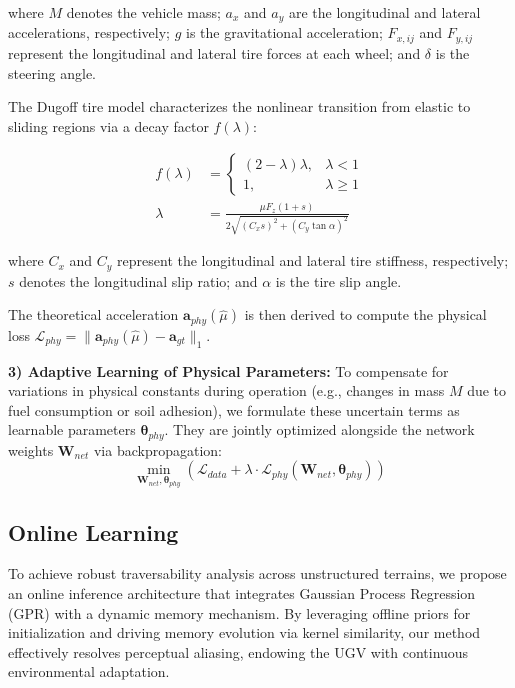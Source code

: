 \documentclass[letterpaper, 10 pt, conference]{ieeeconf}  %
\begin{document}
where $M$ denotes the vehicle mass; $a_x$ and $a_y$ are the longitudinal and lateral accelerations, respectively; $g$ is the gravitational acceleration; $F_{x,ij}$ and $F_{y,ij}$ represent the longitudinal and lateral tire forces at each wheel; and $\delta$ is the steering angle.


The Dugoff tire model characterizes the nonlinear transition from elastic to sliding regions via a decay factor $f(\lambda)$:

\begin{equation}
\label{eq:dugoff}
\begin{aligned}
f(\lambda) &= \begin{cases} (2-\lambda)\lambda, & \lambda < 1 \\ 1, & \lambda \geq 1 \end{cases} \\
\lambda &= \frac{\mu F_z (1+s)}{2 \sqrt{(C_x s)^2 + (C_y \tan \alpha)^2}}
\end{aligned}
\end{equation}

where $C_x$ and $C_y$ represent the longitudinal and lateral tire stiffness, respectively; $s$ denotes the longitudinal slip ratio; and $\alpha$ is the tire slip angle.


The theoretical acceleration $\mathbf{a}_{phy}(\hat{\mu})$ is then derived to compute the physical loss $\mathcal{L}_{phy} = \| \mathbf{a}_{phy}(\hat{\mu}) - \mathbf{a}_{gt} \|_1$.


\textbf{3) Adaptive Learning of Physical Parameters:} To compensate for variations in physical constants during operation (e.g., changes in mass $M$ due to fuel consumption or soil adhesion), we formulate these uncertain terms as learnable parameters $\boldsymbol{\theta}_{phy}$. They are jointly optimized alongside the network weights $\mathbf{W}_{net}$ via backpropagation:
\begin{equation}
\label{eq:joint_opt}
\min_{\mathbf{W}_{net}, \boldsymbol{\theta}_{phy}} \left( \mathcal{L}_{data} + \lambda \cdot \mathcal{L}_{phy}(\mathbf{W}_{net}, \boldsymbol{\theta}_{phy}) \right)
\end{equation}


\subsection{Online Learning}

To achieve robust traversability analysis across unstructured terrains, we propose an online inference architecture that integrates Gaussian Process Regression (GPR) with a dynamic memory mechanism. By leveraging offline priors for initialization and driving memory evolution via kernel similarity, our method effectively resolves perceptual aliasing, endowing the UGV with continuous environmental adaptation.
\end{document}
